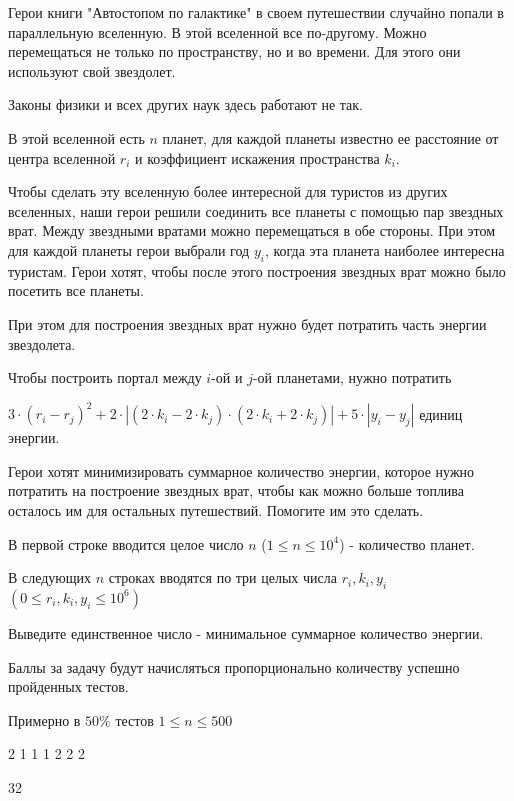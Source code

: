 
Герои книги "Автостопом по галактике" в своем путешествии случайно попали в параллельную вселенную. В этой вселенной все по-другому. 
Можно перемещаться не только по пространству, но и во времени. Для этого они используют свой звездолет.

Законы физики и всех других наук здесь работают не так.

В этой вселенной есть $n$ планет, для каждой планеты известно ее расстояние от центра вселенной $r_i$ и коэффициент искажения пространства 
$k_i$.

Чтобы сделать эту вселенную более интересной для туристов из других вселенных, наши герои решили соединить все планеты с помощью пар звездных 
врат. Между звездными вратами можно перемещаться в обе стороны. При этом для каждой планеты герои выбрали год $y_i$, когда эта планета наиболее 
интересна туристам. Герои хотят, чтобы после этого построения звездных врат можно было посетить все планеты.

При этом для построения звездных врат нужно будет потратить часть энергии звездолета.

Чтобы построить портал между $i$-ой и $j$-ой планетами, нужно потратить

$3 \cdot (r_{i} - r_{j})^{2} + 2 \cdot |(2 \cdot k_{i} - 2 \cdot k_{j}) \cdot (2 \cdot k_{i} + 2 \cdot k_{j})| + 5 \cdot |y_{i} - y_{j}|$ единиц энергии.

Герои хотят минимизировать суммарное количество энергии, которое нужно потратить на построение звездных врат, чтобы как можно больше топлива осталось им для остальных путешествий. Помогите им это сделать.


В первой строке вводится целое число $n$ ($1 \le n \le 10^4$) - количество планет.

В следующих $n$ строках вводятся по три целых числа $r_i, k_i, y_i$ $(0 \le r_i, k_i,y_i\le 10^6)$

\outputfmtSection

Выведите единственное число - минимальное суммарное количество энергии.

\markSection

Баллы за задачу будут начисляться пропорционально количеству успешно пройденных тестов.

Примерно в $50\%$  тестов $1 \le n \le 500$ 



\begin{myverbbox}[\small]{\vinput}
    2
    1 1 1
    2 2 2
\end{myverbbox}
\begin{myverbbox}[\small]{\voutput}
    32
\end{myverbbox}

